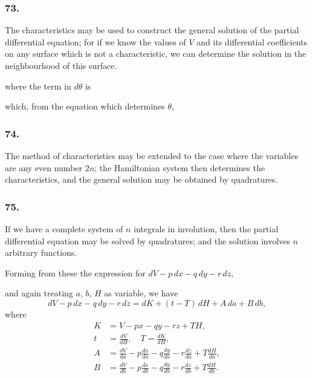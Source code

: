\documentclass[12pt,a4paper]{article}
\theoremstyle{plain}
\begin{document}
\subsubsection*{73.}

The characteristics may be used to construct the general solution of the partial differential equation; for if we know the values of $V$ and its differential coefficients on any surface which is not a characteristic, we can determine the solution in the neighbourhood of this surface.

\newpage
\setcounter{page}{147}

where the term in $d\theta$ is

which, from the equation which determines $\theta$,

\subsubsection*{74.}

The method of characteristics may be extended to the case where the variables are any even number $2n$; the Hamiltonian system then determines the characteristics, and the general solution may be obtained by quadratures.

\subsubsection*{75.}

If we have a complete system of $n$ integrals in involution, then the partial differential equation may be solved by quadratures; and the solution involves $n$ arbitrary functions.

\newpage
\setcounter{page}{148}

Forming from these the expression for $dV - p\,dx - q\,dy - r\,dz$,

and again treating $a$, $b$, $H$ as variable, we have
\[
dV - p\,dx - q\,dy - r\,dz = dK + (t - T)\,dH + A\,da + B\,db,
\]
where
\begin{align*}
K &= V - px - qy - rz + T H, \\
t &= \frac{dV}{dH}, \quad T = \frac{dK}{dH}, \\
A &= \frac{dV}{da} - p\frac{dx}{da} - q\frac{dy}{da} - r\frac{dz}{da} + T\frac{dH}{da}, \\
B &= \frac{dV}{db} - p\frac{dx}{db} - q\frac{dy}{db} - r\frac{dz}{db} + T\frac{dH}{db}.
\end{align*}

\newpage
\setcounter{page}{149}
\end{document}
